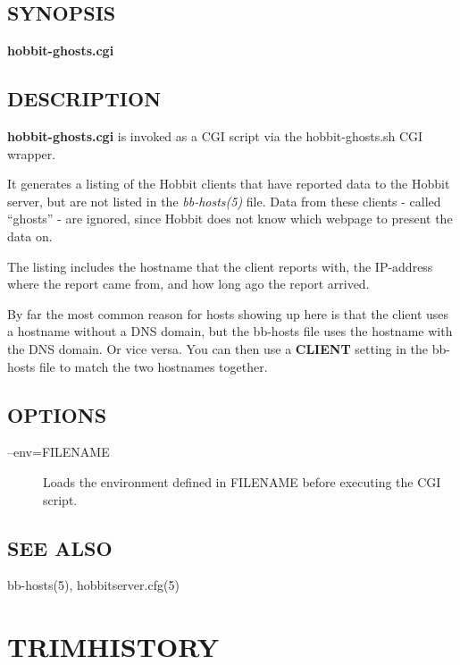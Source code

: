  \subsection{SYNOPSIS}
\textbf{hobbit-ghosts.cgi}


 
\subsection{DESCRIPTION}
\textbf{hobbit-ghosts.cgi} is invoked as a CGI script via the hobbit-ghosts.sh CGI wrapper. 

  It generates a listing of the Hobbit clients that have reported data
  to the Hobbit server, but are not listed in the \emph{bb-hosts(5)}
  file. Data from these clients - called ``ghosts'' - are ignored,
  since Hobbit does not know which webpage to present the data on. 



  The listing includes the hostname that the client reports with, the
  IP-address where the report came from, and how long ago the report
  arrived. 



  By far the most common reason for hosts showing up here is that the
  client uses a hostname without a DNS domain, but the bb-hosts file
  uses the hostname with the DNS domain. Or vice versa. You can then
  use a \textbf{CLIENT} setting in the bb-hosts file to match the two
  hostnames together. 



 
\subsection{OPTIONS}
\begin{description}
\item[--env=FILENAME] Loads the environment defined in FILENAME before executing the CGI script. 


\end{description}
\subsection{SEE ALSO}
bb-hosts(5), hobbitserver.cfg(5) 

 

%
\newpage
\section{TRIMHISTORY}

